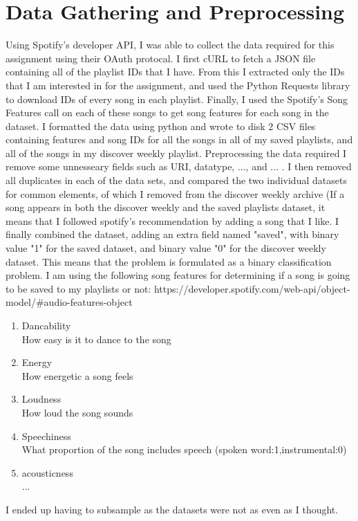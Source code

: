 \documentclass{article}
\begin{document}
    \section{Data Gathering and Preprocessing}
        Using Spotify's developer API, I was able to collect the data required for this assignment using their OAuth protocal. I first cURL to fetch a JSON file containing all of the playlist IDs that I have. From this I extracted only the IDs that I am interested in for the assignment, and used the Python Requests library to download IDs of every song in each playlist. Finally, I used the Spotify's Song Features call on each of these songs to get song features for each song in the dataset. I formatted the data using python and wrote to disk 2 CSV files containing features and song IDs for all the songs in all of my saved playlists, and all of the songs in my discover weekly playlist.
        Preprocessing the data required I remove some unnesseary fields such as URI, datatype, ..., and ... . I then removed all duplicates in each of the data sets, and compared the two individual datasets for common elements, of which I removed from the discover weekly archive (If a song appears in both the discover weekly and the saved playlists dataset, it means that I followed spotify's recommendation by adding a song that I like. I finally combined the dataset, adding an extra field named "saved", with binary value "1" for the saved dataset, and binary value "0" for the discover weekly dataset. 
        This means that the problem is formulated as a binary classification problem. I am using the following song features for determining if a song is going to be saved to my playlists or not:
        https://developer.spotify.com/web-api/object-model/#audio-features-object
            \begin{enumerate}
                    \item Dancability \\
                          How easy is it to dance to the song
                    \item Energy \\
                            How energetic a song feels
                    \item Loudness \\
                            How loud the song sounds
                    \item Speechiness \\
                            What proportion of the song includes speech (spoken word:1,instrumental:0)
                    \item acousticness \\ ...
            \end{enumerate}

            I ended up having to subsample as the datasets were not as even as I thought. 
\end{document}
